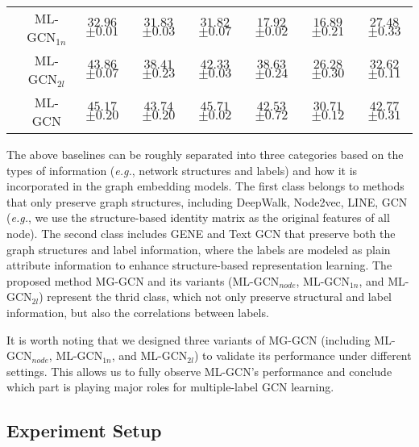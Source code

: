 \documentclass[conference]{IEEEtran}
\begin{document}
\begin{table*}[ht]
\begin{tabular}{c|c|c|c|c|c|c|c}
& ML-GCN$_{1n}$ & {$32.96${\tiny $\pm0.01$}} & {$31.83${\tiny $\pm0.03$}} &   {$31.82${\tiny $\pm0.07$}} & {$17.92${\tiny $\pm0.02$}} & {$16.89${\tiny$\pm0.21$}} &  {$27.48${\tiny$\pm0.33$}} \\

& ML-GCN$_{2l}$ & {$\textit{43.86}${\tiny $\pm\textit{0.07}$}} & {$38.41${\tiny $\pm0.23$}} &   {$42.33${\tiny $\pm0.03$}} & {$\textit{38.63}${\tiny $\pm\textit{0.24}$}} & {$\textit{26.28}${\tiny$\pm\textit{0.30}$}} &  {$32.62${\tiny$\pm0.11$}} \\

& ML-GCN & {$\mathbf{45.17}${\tiny $\pm\mathbf{0.20}$}} & {$\mathbf{43.74}${\tiny $\pm\mathbf{0.20}$}} &   {$\mathbf{45.71}${\tiny $\pm\mathbf{0.02}$}} & {$\mathbf{42.53}${\tiny $\pm\mathbf{0.72}$}} & {$\mathbf{30.71}${\tiny$\pm\mathbf{0.12}$}} &  {$\mathbf{42.77}${\tiny$\pm\mathbf{0.31}$}} \\
\bottomrule
\end{tabular}
\end{table*}



The above baselines can be roughly separated into three categories based on the types of information (\textit{e.g.}, network structures and labels) and how it is incorporated in the graph embedding models. The first class belongs to methods that only preserve graph structures, including DeepWalk, Node2vec, LINE, GCN (\textit{e.g.}, we use the structure-based identity matrix as the original features of all node). The second class includes GENE and Text GCN that preserve both the graph structures and label information, where the labels are modeled as plain attribute information to enhance structure-based representation learning. The proposed method MG-GCN and its variants (ML-GCN$_{node}$, ML-GCN$_{1n}$, and ML-GCN$_{2l}$) represent the thrid class, which not only preserve structural and label information, but also the correlations between labels. 

It is worth noting that we designed three variants of MG-GCN (including ML-GCN$_{node}$, ML-GCN$_{1n}$, and ML-GCN$_{2l}$) to validate its performance under different settings. This allows us to fully observe ML-GCN's performance and conclude which part is playing major roles for multiple-label GCN learning. 

\subsection{Experiment Setup}
\end{document}
